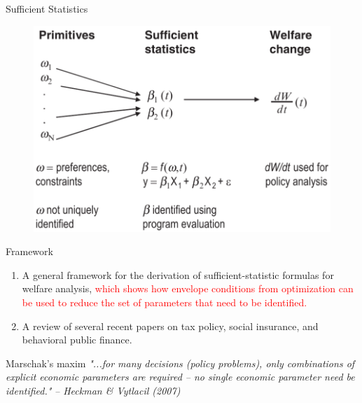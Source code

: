 \documentclass{beamer}
\begin{document}
\begin{frame}{Sufficient Statistics}
	\begin{figure}[h]
		\centering
		\includegraphics[scale=0.7]{figure1.png}
	\end{figure}
\end{frame}
\begin{frame}{Framework}
	\begin{enumerate}
		\item A general framework for the derivation of sufficient-statistic formulas for welfare analysis, \textcolor{red}{which shows how envelope conditions from optimization can be used to reduce the set of parameters that need to be identified.}
		\item A review of several recent papers on tax policy, social insurance, and behavioral public finance.
	\end{enumerate}
	\medskip
	\begin{block}{Marschak's maxim}
		\textit{"...for many decisions (policy problems), only combinations of explicit economic parameters are required -- no single economic parameter need be identified."}
		\hfill \textit{-- Heckman \& Vytlacil (2007)}
	\end{block}
\end{frame}
\end{document}
